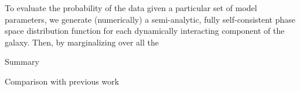 \documentclass[preprint,12pt]{aastex}
\begin{document}
To evaluate the probability of the data given a particular set of model
parameters, we generate (numerically) a semi-analytic, fully self-consistent
phase space distribution function for each dynamically interacting component
of the galaxy. Then, by marginalizing over all the

Summary

Comparison with previous work











\end{document}
